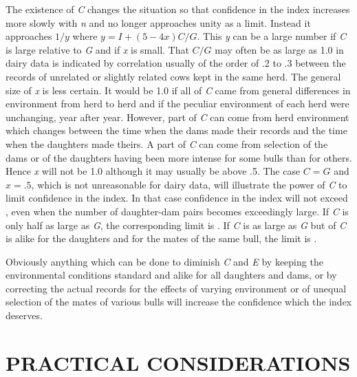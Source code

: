 The existence of \textit{C} changes the situation so that confidence in the
index increases more slowly with \textit{n} and no longer approaches unity
as a limit. Instead it approaches $1/y$ where $y = I + (5 - 4x)C/G$. This
\textit{y} can be a large number if \textit{C} is large relative to \textit{G}
and if \textit{x} is small. That
$C/G$ may often be as large as 1.0 in dairy data is indicated by correlation
usually of the order of .2 to .3 between the records of unrelated or
slightly related cows kept in the same herd. The general size of \textit{x}
is less certain. It would be 1.0 if all of \textit{C} came from general
differences in environment from herd to herd and if the peculiar environment
of each herd were unchanging, year after year. However, part of \textit{C}
can come from herd environment which changes between the time when the
dams made their records and the time when the daughters made theirs.
A part of \textit{C} can come from selection of the dams or of the daughters
having been more intense for some bulls than for others. Hence \textit{x}
will not be 1.0 although it may usually be above .5. The case $C = G$ and
$x = .5$, which is not unreasonable for dairy data, will illustrate the
power of \textit{C} to limit confidence in the index. In that case confidence
in the index will not exceed , even when the number of daughter-dam
pairs becomes exceedingly large. If \textit{C} is only half as large as
\textit{G}, the corresponding limit is . If \textit{C} is as large
as \textit{G} but  of \textit{C} is alike for the daughters and
for the mates of the same bull, the limit is .

Obviously anything which can be done to diminish \textit{C} and
\textit{E} by keeping the environmental conditions standard and
alike for all daughters and dams, or by correcting the actual
records for the effects of varying environment or of unequal
selection of the mates of various bulls will increase the confidence
which the index deserves.

\section*{PRACTICAL CONSIDERATIONS}


